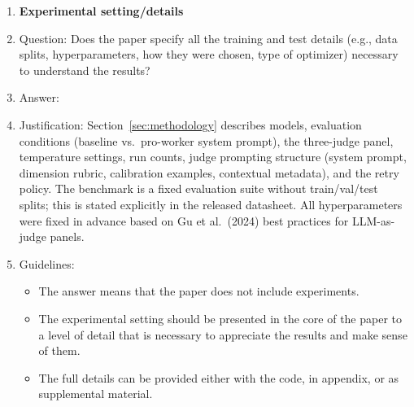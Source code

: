\begin{enumerate}
\item {\bf Experimental setting/details}
    \item[] Question: Does the paper specify all the training and test details (e.g., data splits, hyperparameters, how they were chosen, type of optimizer) necessary to understand the results?
    \item[] Answer: \answerYes{}
    \item[] Justification: Section~\ref{sec:methodology} describes models, evaluation conditions (baseline vs.\ pro-worker system prompt), the three-judge panel, temperature settings, run counts, judge prompting structure (system prompt, dimension rubric, calibration examples, contextual metadata), and the retry policy. The benchmark is a fixed evaluation suite without train/val/test splits; this is stated explicitly in the released datasheet. All hyperparameters were fixed in advance based on Gu et al.\ (2024) best practices for LLM-as-judge panels.
    \item[] Guidelines:
    \begin{itemize}
        \item The answer \answerNA{} means that the paper does not include experiments.
        \item The experimental setting should be presented in the core of the paper to a level of detail that is necessary to appreciate the results and make sense of them.
        \item The full details can be provided either with the code, in appendix, or as supplemental material.
    \end{itemize}


\end{enumerate}
